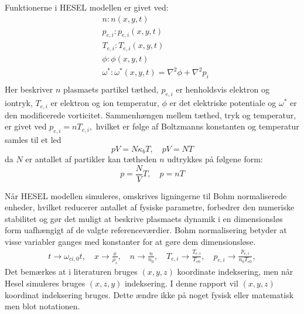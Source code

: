 Funktionerne i HESEL modellen er givet ved:
\begin{align*}
    &n: n(x,y,t)\\
    &p_{e,i}: p_{e,i}(x,y,t)\\
    &T_{e,i}: T_{e,i}(x,y,t)\\
    &\phi: \phi(x,y,t)\\
    &\omega^*: \omega^*(x,y,t) = \nabla^2\phi + \nabla^2 p_i\\
\end{align*}
Her beskriver $n$ plasmaets partikel tæthed, $p_{e,i}$ er henholdsvis elektron og iontryk, $T_{e,i}$ er elektron og ion temperatur, $\phi$ er det elektriske potentiale og $\omega^*$ er den modificerede vorticitet.
Sammenhængen mellem tæthed, tryk og temperatur, er givet ved $p_{e,i} = nT_{e,i},$ hvilket er følge af Boltzmanns konstanten og temperatur samles til et led 
\begin{equation*}
    pV =N \kappa_b T,\quad pV = NT
\end{equation*}
da $N$ er antallet af partikler kan tætheden $n$ udtrykkes på følgene form:
\begin{equation*}
    p = \frac{N}{V}T,\quad p = nT
\end{equation*}

Når HESEL modellen simuleres, omskrives ligningerne til Bohm normaliserede enheder, hvilket reducerer antallet af fysiske parametre,
forbedrer den numeriske stabilitet og gør det muligt at beskrive plasmaets dynamik i en dimensionsløs form uafhængigt af de valgte referenceværdier.
Bohm normalisering betyder at visse variabler ganges med konstanter for at gøre dem dimensionsløse.
\begin{align*}
    t \rightarrow \omega_{ci,0} t,\quad
    x \rightarrow \frac{x}{\rho_s}, \quad
    n \rightarrow \frac{n}{n_0}, \quad
    T_{e,i} \rightarrow \frac{T_{e,i}}{T_{e0}}, \quad
    p_{e,i} \rightarrow \frac{p_{e,i}}{n_0T_{e0}},
\end{align*}
Det bemærkes at i literaturen bruges $(x,y,z)$ koordinate indeksering, men når Hesel simuleres bruges $(x,z,y)$ indeksering.
I denne rapport vil $(x,y,z)$ koordinat indeksering bruges. Dette ændre ikke på noget fysisk eller matematisk men blot notationen.

